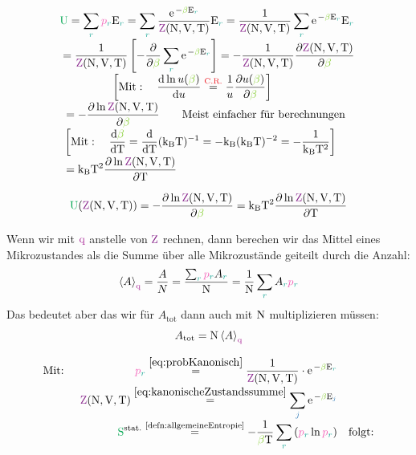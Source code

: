 \begin{sectionbox}\nospacing
  \begin{align*}
    &\hspace{-1mm}\Upot=\sum_{\idxr}\pbr\Ezr=\sum_{\idxr}\frac{\e^{-\betac\Ezr}}{\Zzk}\Ezr=\frac{1}{\Zzk}\sum_{\idxr}\e^{-\betac\Ezr}\Ezr\nalign
    &\hspace{-1mm}=\frac{1}{\Zzk}\left[-\pfrac{}{\betac}\sum_{\idxr}\e^{-\betac\Ezr}\right]=-\frac{1}{\Zzk}\pfrac{\Zzk}{\betac}\nalign
    &\hspace{1.5cm}\left[\text{Mit}:\quad \frac{\diff\ln u(\betac)}{\diff u}\eqs{\text{\rd{C.R.}}}\frac{1}{u}\frac{\partial u(\betac)}{\partial\betac}\right]\nalign
    &=-\pfrac{\ln\Zzk}{\betac}\qquad \text{Meist einfacher für berechnungen}\nalign
    &\left[\text{Mit}:\quad \difrac{\betac}{\Tz}=\difrac{}{\Tz}(\kb\Tz)^{-1}=-\kb(\kb\Tz)^{-2}=-\frac{1}{\kb\Tz^2}\right]\nalign
    &=\kb\Tz^2 \pfrac{\ln\Zzk}{\Tz}
  \end{align*}
\end{sectionbox}
\begin{defnbox}\nospacing
  \begin{defn}\label{defn:EntropieKanonisch}
    \begin{equation}
      \Upot(\Zzk)=-\pfrac{\ln\Zzk}{\betac}=\kb\Tz^2 \pfrac{\ln\Zzk}{\Tz}
    \end{equation}
  \end{defn}
\end{defnbox}
\begin{notebox}[Bemerkung $\qz$]\nospacing
  Wenn wir mit $\qz$ anstelle von $\Zz$ rechnen, dann berechen wir das Mittel eines Mikrozustandes als die Summe über alle Mikrozustände geiteilt durch die Anzahl:
  \begin{align*}
    \obs{A}_{\qz}=\frac{A}{N}=\frac{\sum_{\idxr}\pbr A_{\idxr}}{\Nz}=\frac{1}{\Nz}\sum_{\idxr}A_{\idxr}\pbr
  \end{align*}
  Das bedeutet aber das wir für $A_{\text{tot}}$ dann auch mit $\mathrm{N}$ multiplizieren müssen:
  \begin{align*}
    A_{\text{tot}}=\Nz\obs{A}_{\qz}
  \end{align*}
\end{notebox}
\begin{sectionbox}\nospacing
  \begin{align*}
    &\text{Mit: }&\pbr\eqs{\cref{eq:probKanonisch}}\frac{1}{\Zzk}\cdot\e^{-\betac\Ezr}\nalign
    &&\Zzk\eqs{\cref{eq:kanonischeZustandssumme}}\sum_{\idxj}\e^{-\betac\Ez_{\idxj}}\nalign
    &&\Spots\eqs{\text{\Cref{defn:allgemeineEntropie}}}-\frac{1}{\betac\Tz}\sum_{\idxr}\left(\pbr\ln\pbr\right)&&\text{folgt:}
  \end{align*}
\end{sectionbox}

